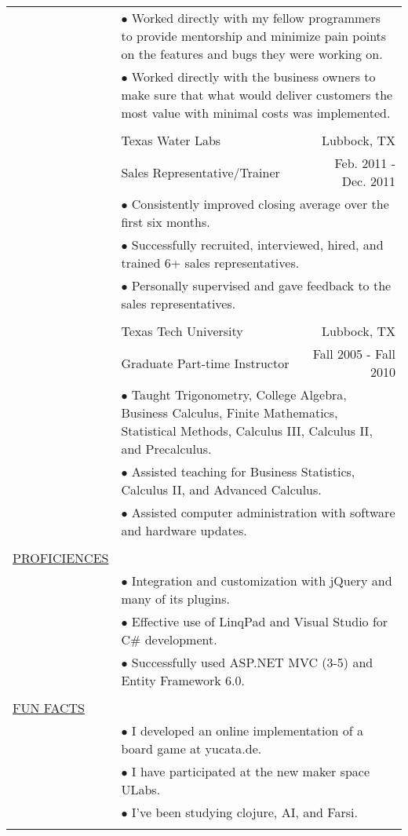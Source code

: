 \documentclass[11pt,oneside,letterpaper,titlepage,fleqn]{article}
\begin{document}
\begin{tabular}[h]{@{}p{3.25cm}@{}lr}
           & \multicolumn{2}{p{14cm}}{$\bullet$ Worked directly with my fellow programmers to provide mentorship and minimize pain points
 on the features and bugs they were working on.}\\			
           & \multicolumn{2}{p{14cm}}{$\bullet$ Worked directly with the business owners to make sure that what would deliver customers the
 most value with minimal costs was implemented.}\\
\\
						& Texas Water Labs & Lubbock, TX\\
						& Sales Representative/Trainer	 &  Feb. 2011 - Dec. 2011\\
           & \multicolumn{2}{p{14cm}}{$\bullet$ Consistently improved closing average over the first six months.}\\
           & \multicolumn{2}{p{14cm}}{$\bullet$ Successfully recruited, interviewed, hired, and trained 6+ sales representatives.}\\
           & \multicolumn{2}{p{14cm}}{$\bullet$ Personally supervised and gave feedback to the sales representatives.}\\
\\
						& Texas Tech University & Lubbock, TX\\
						& Graduate Part-time Instructor	 &  Fall 2005 - Fall 2010\\
           & \multicolumn{2}{p{14cm}}{$\bullet$ Taught Trigonometry, College Algebra, Business Calculus, Finite Mathematics, Statistical
Methods, Calculus III, Calculus II, and Precalculus.}\\
           & \multicolumn{2}{p{14cm}}{$\bullet$ Assisted teaching for Business Statistics, Calculus II, and Advanced Calculus.}\\
           & \multicolumn{2}{p{14cm}}{$\bullet$ Assisted computer administration with software and hardware updates.}\\
\\
\underline{PROFICIENCES}\\    
           & \multicolumn{2}{p{14cm}}{$\bullet$ Integration and customization with jQuery and many of its plugins.}\\
           & \multicolumn{2}{p{14cm}}{$\bullet$ Effective use of LinqPad and Visual Studio for C\# development.}\\
           & \multicolumn{2}{p{14cm}}{$\bullet$ Successfully used ASP.NET MVC (3-5) and Entity Framework 6.0.}\\					
\\
\underline{FUN FACTS}\\    
           & \multicolumn{2}{p{14cm}}{$\bullet$ I developed an online implementation of a board game at yucata.de.}\\
           & \multicolumn{2}{p{14cm}}{$\bullet$ I have participated at the new maker space ULabs.}\\
           & \multicolumn{2}{p{14cm}}{$\bullet$ I've been studying clojure, AI, and Farsi.}\\					
\\					  				
\end{tabular}
\end{document}

